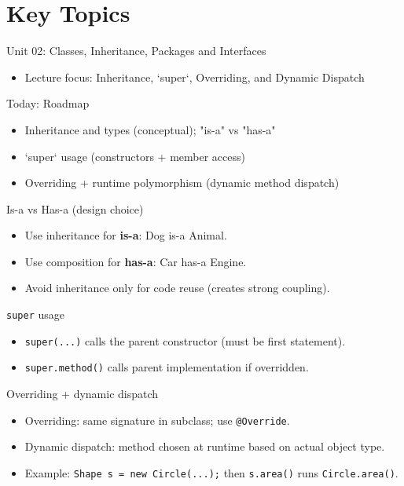 \documentclass{beamer}
\begin{document}
\section{Key Topics}
\label{sec:concepts}

\begin{frame}{Unit 02: Classes, Inheritance, Packages and Interfaces}
  \begin{itemize}[<+->]
    \item Lecture focus: Inheritance, `super`, Overriding, and Dynamic Dispatch
  \end{itemize}
  \slidesources{\OOPSUnitIISources}
\end{frame}

\begin{frame}{Today: Roadmap}
  \begin{itemize}[<+->]
    \item Inheritance and types (conceptual); "is-a" vs "has-a"
    \item `super` usage (constructors + member access)
    \item Overriding + runtime polymorphism (dynamic method dispatch)
  \end{itemize}
  \slidesources{\OOPSUnitIISources}
\end{frame}

\begin{frame}{Is-a vs Has-a (design choice)}
  \begin{itemize}[<+->]
    \item Use inheritance for \textbf{is-a}: Dog is-a Animal.
    \item Use composition for \textbf{has-a}: Car has-a Engine.
    \item Avoid inheritance only for code reuse (creates strong coupling).
  \end{itemize}
  \slidesources{\OOPSUnitIISources}
\end{frame}

\begin{frame}{\texttt{super} usage}
  \begin{itemize}[<+->]
    \item \texttt{super(...)} calls the parent constructor (must be first statement).
    \item \texttt{super.method()} calls parent implementation if overridden.
  \end{itemize}
  \slidesources{\OOPSUnitIISources}
\end{frame}

\begin{frame}{Overriding + dynamic dispatch}
  \begin{itemize}[<+->]
    \item Overriding: same signature in subclass; use \texttt{@Override}.
    \item Dynamic dispatch: method chosen at runtime based on actual object type.
    \item Example: \texttt{Shape s = new Circle(...);} then \texttt{s.area()} runs \texttt{Circle.area()}.
  \end{itemize}
  \slidesources{\OOPSUnitIISources}
\end{frame}
\end{document}
